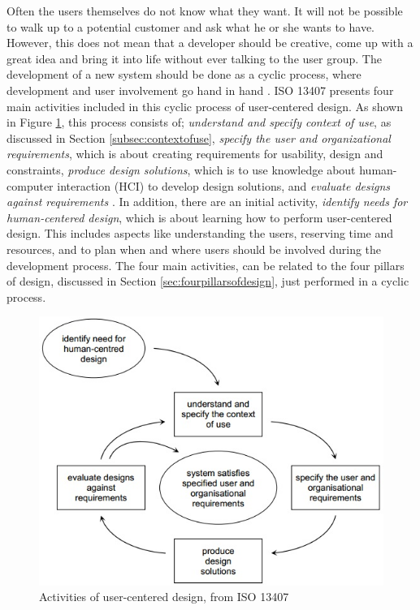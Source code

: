 Often the users themselves do not know what they want. It will not be possible to walk up to a potential customer and ask what he or she wants to have. However, this does not mean that a developer should be creative, come up with a great idea and bring it into life without ever talking to the user group. The development of a new system should be done as a cyclic process, where development and user involvement go hand in hand \cite{mmi}. ISO 13407 presents four main activities included in this cyclic process of user-centered design. As shown in Figure \ref{userdesign}, this process consists of; \emph{understand and specify context of use}, as discussed in Section \ref{subsec:contextofuse}, \emph{specify the user and organizational requirements}, which is about creating requirements for usability, design and constraints, \emph{produce design solutions}, which is to use knowledge about human-computer interaction (HCI) to develop design solutions, and \emph{evaluate designs against requirements} \cite{jokela2003standard}. In addition, there are an initial activity, \emph{identify needs for human-centered design}, which is about learning how to perform user-centered design. This includes aspects like understanding the users, reserving time and resources, and to plan when and where users should be involved during the development process. The four main activities, can be related to the four pillars of design, discussed in Section \ref{sec:fourpillarsofdesign}, just performed in a cyclic process. 

\begin{figure} [H]
\centering
\includegraphics[scale=0.7]{userCenteredDesign.jpg}
\caption[User-centered design]{Activities of user-centered design, from ISO 13407 \cite{jokela2003standard}}
\label{userdesign}
\end{figure}


